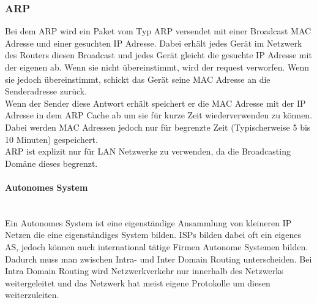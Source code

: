 \documentclass{article}
\newcommand{\paragraphlb}[1]{\paragraph{#1}\mbox{}\\}
\begin{document}
	 \subsubsection{ARP}
	 Bei dem ARP wird ein Paket vom Typ ARP versendet mit einer Broadcast MAC Adresse und einer gesuchten IP Adresse. Dabei erhält jedes Gerät im Netzwerk des Routers diesen Broadcast und jedes Gerät gleicht die gesuchte IP Adresse mit der eigenen ab. Wenn sie nicht übereinstimmt, wird der request verworfen. Wenn sie jedoch übereinstimmt, schickt das Gerät seine MAC Adresse an die Senderadresse zurück. \\
	 Wenn der Sender diese Antwort erhält speichert er die MAC Adresse mit der IP Adresse in dem ARP Cache ab um sie für kurze Zeit wiederverwenden zu können. Dabei werden MAC Adressen jedoch nur für begrenzte Zeit (Typischerweise 5 bis 10 Minuten) gespeichert. \\
	 ARP ist explizit nur für LAN Netzwerke zu verwenden, da die Broadcasting Domäne dieses begrenzt.
	 \paragraphlb{Autonomes System}
	 Ein Autonomes System ist eine eigenständige Ansammlung von kleineren IP Netzen die eine eigenständiges System bilden. ISPs bilden dabei oft ein eigenes AS, jedoch können auch international tätige Firmen Autonome Systemen bilden. \\
	 Dadurch muss man zwischen Intra- und Inter Domain Routing unterscheiden. Bei Intra Domain Routing wird Netzwerkverkehr nur innerhalb des Netzwerks weitergeleitet und das Netzwerk hat meist eigene Protokolle um diesen weiterzuleiten. 
\end{document}
